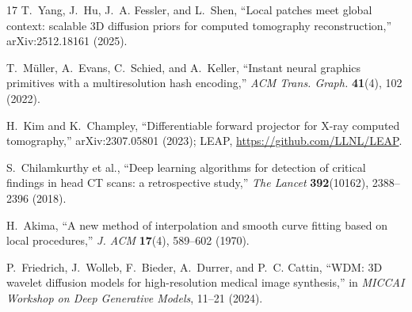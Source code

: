 \documentclass[11pt]{article}
\begin{document}
\begin{thebibliography}{17}
 T.~Yang, J.~Hu, J.~A. Fessler, and L.~Shen, ``Local patches meet global
context: scalable 3D diffusion priors for computed tomography reconstruction,''
arXiv:2512.18161 (2025).

 T.~M\"uller, A.~Evans, C.~Schied, and A.~Keller, ``Instant neural
graphics primitives with a multiresolution hash encoding,'' \emph{ACM Trans. Graph.}
\textbf{41}(4), 102 (2022).

 H.~Kim and K.~Champley, ``Differentiable forward projector for X-ray
computed tomography,'' arXiv:2307.05801 (2023); LEAP,
\url{https://github.com/LLNL/LEAP}.

 S.~Chilamkurthy et al., ``Deep learning algorithms for detection of critical
findings in head CT scans: a retrospective study,'' \emph{The Lancet} \textbf{392}(10162),
2388--2396 (2018).

 H.~Akima, ``A new method of interpolation and smooth curve fitting based on
local procedures,'' \emph{J. ACM} \textbf{17}(4), 589--602 (1970).

 P.~Friedrich, J.~Wolleb, F.~Bieder, A.~Durrer, and P.~C. Cattin, ``WDM: 3D
wavelet diffusion models for high-resolution medical image synthesis,'' in \emph{MICCAI
Workshop on Deep Generative Models}, 11--21 (2024).

\end{thebibliography}
\end{document}
